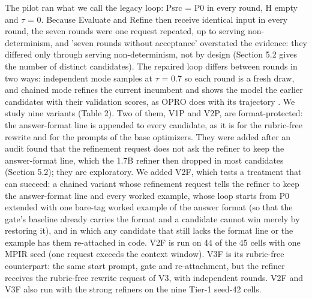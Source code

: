 \documentclass{ieeeaccess}
\begin{document}
The pilot ran what we call the legacy loop: Psrc = P0 in every round, H empty and $\tau$ = 0. Because Evaluate and Refine then receive identical input in every round, the seven rounds were one request repeated, up to serving non-determinism, and 'seven rounds without acceptance' overstated the evidence: they differed only through serving non-determinism, not by design (Section 5.2 gives the number of distinct candidates). The repaired loop differs between rounds in two ways: independent mode samples at $\tau$ = 0.7 so each round is a fresh draw, and chained mode refines the current incumbent and shows the model the earlier candidates with their validation scores, as OPRO does with its trajectory \cite{yang2024}. We study nine variants (Table 2). Two of them, V1P and V2P, are format-protected: the answer-format line is appended to every candidate, as it is for the rubric-free rewrite and for the prompts of the base optimizers. They were added after an audit found that the refinement request does not ask the refiner to keep the answer-format line, which the 1.7B refiner then dropped in most candidates (Section 5.2); they are exploratory. We added V2F, which tests a treatment that can succeed: a chained variant whose refinement request tells the refiner to keep the answer-format line and every worked example, whose loop starts from P0 extended with one bare-tag worked example of the answer format (so that the gate's baseline already carries the format and a candidate cannot win merely by restoring it), and in which any candidate that still lacks the format line or the example has them re-attached in code. V2F is run on 44 of the 45 cells with one MPIR seed (one request exceeds the context window). V3F is its rubric-free counterpart: the same start prompt, gate and re-attachment, but the refiner receives the rubric-free rewrite request of V3, with independent rounds. V2F and V3F also run with the strong refiners on the nine Tier-1 seed-42 cells.
\end{document}
